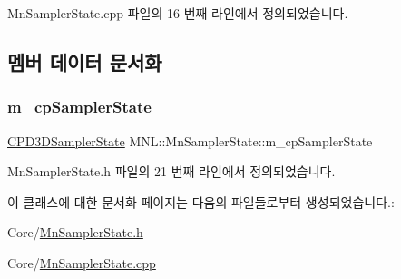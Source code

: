 Mn\+Sampler\+State.\+cpp 파일의 16 번째 라인에서 정의되었습니다.



\subsection{멤버 데이터 문서화}
\mbox{\label{class_m_n_l_1_1_mn_sampler_state_a6f1c6720b585541557ebd9fee09af0fe}} 
\subsubsection{\texorpdfstring{m\+\_\+cp\+Sampler\+State}{m\_cpSamplerState}}
{\footnotesize\ttfamily \hyperlink{namespace_m_n_l_ae0141196161ecb3d3055523077ca3aa1}{C\+P\+D3\+D\+Sampler\+State} M\+N\+L\+::\+Mn\+Sampler\+State\+::m\+\_\+cp\+Sampler\+State\hspace{0.3cm}{\ttfamily [private]}}



Mn\+Sampler\+State.\+h 파일의 21 번째 라인에서 정의되었습니다.



이 클래스에 대한 문서화 페이지는 다음의 파일들로부터 생성되었습니다.\+:\begin{DoxyCompactItemize}
\item 
Core/\hyperlink{_mn_sampler_state_8h}{Mn\+Sampler\+State.\+h}\item 
Core/\hyperlink{_mn_sampler_state_8cpp}{Mn\+Sampler\+State.\+cpp}\end{DoxyCompactItemize}
